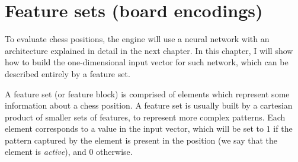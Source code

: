 \newcommand{\white}{\fullmoon}
\newcommand{\black}{\newmoon}

\newcommand{\bigtimes}{\mathop{\raisebox{-0.5ex}{\scalebox{2}{$\times$}}}}

\newcommand{\pieceBoard}{
    \newcount\pieceindex
    \setcounter{pieceindex}{0}
    \raisebox{-7ex}{
        \centering
        \chessboard[
            tinyboard,
            showmover=false,
            margin=false,
            padding=false,
            hlabel=false,
            vlabel=false,
            pgfstyle={text},
            text=\fontsize{1.2ex}{1.2ex}\bfseries\sffamily \currentwq,
            markboard
        ]
    }
}
\newcommand{\pieceRolesTable}{
    \begin{tabular}{|l|}
        \hline
        \sympawn\ Pawn \\
        \hline
        \symknight\ Knight \\
        \hline
        \symbishop\ Bishop \\
        \hline
        \symrook\ Rook \\
        \hline
        \symqueen\ Queen \\
        \hline
        \symking\ King \\
        \hline
    \end{tabular}
}
\newcommand{\pieceColorsTable}{
    \begin{tabular}{|l|}
        \hline
        $\white$ White \\
        \hline
        $\black$ Black \\
        \hline
    \end{tabular}
}

\newcommand{\featureset}[1]{\textsc{#1}}


\section{Feature sets (board encodings)}

To evaluate chess positions, the engine will use a neural network with an architecture explained in detail in the next chapter. In this chapter, I will show how to build the one-dimensional input vector for such network, which can be described entirely by a feature set.

A feature set (or feature block) is comprised of elements which represent some information about a chess position. A feature set is usually built by a cartesian product of smaller sets of features, to represent more complex patterns. Each element corresponds to a value in the input vector, which will be set to $1$ if the pattern captured by the element is present in the position (we say that the element is \textit{active}), and $0$ otherwise.

